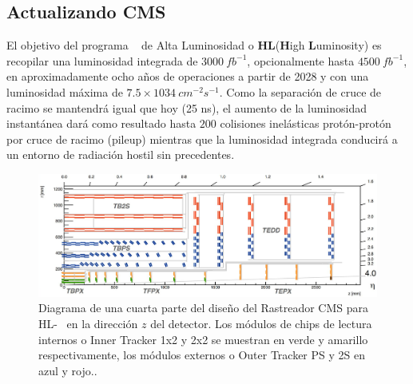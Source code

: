 %
%

\subsection{Actualizando CMS }

El objetivo del programa \LHC ~ de Alta Luminosidad o \textbf{HL}(\textbf{H}igh \textbf{L}uminosity) es recopilar una luminosidad integrada de $3000 ~ fb^{-1}$, opcionalmente hasta $4500 ~ fb^{-1}$, en aproximadamente ocho años de operaciones a partir de 2028 y con una luminosidad máxima de $7.5 \times 1034~cm^{-2}s^{-1}$. Como la separación de cruce de racimo se mantendrá igual que hoy (25 ns), el aumento de la luminosidad instantánea dará como resultado hasta $200$ colisiones inelásticas protón-protón por cruce de racimo (pileup) mientras que la luminosidad integrada conducirá a un entorno de radiación hostil sin precedentes. %

\begin{figure}[!h]
\centering
\includegraphics[width=.95\textwidth]{Cap2/imagenes/track.png}
\caption[Diagrama de una cuarta parte del diseño del Rastreador \CMS ~ para \LHC ~ en la dirección $z$ del detector. Los módulos de chips de lectura internos o Inner Tracker 1x2 y 2x2 se muestran en verde y amarillo respectivamente, los módulos externos o Outer Tracker PS y 2S en azul y rojo.]{Diagrama de una cuarta parte del diseño del Rastreador CMS para HL-\LHC ~ en la dirección $z$ del detector. Los módulos de chips de lectura internos o Inner Tracker 1x2 y 2x2 se muestran en verde y amarillo respectivamente, los módulos externos o Outer Tracker PS y 2S en azul y rojo.\footnotemark.}
\label{track}
\end{figure}



